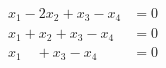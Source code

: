 \begin{align*}
x_1 - 2x_2 + x_3 - x_4 &= 0\\
x_1 + x_2 + x_3 - x_4 &= 0\\
x_1 \quad + x_3 - x_4 &= 0
\end{align*}